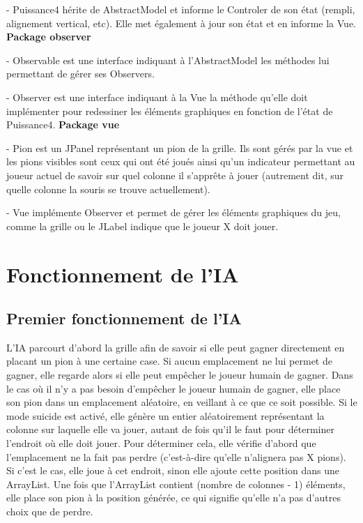 \documentclass{report}
\begin{document}
- Puissance4 hérite de AbstractModel et informe le Controler de son état (rempli, alignement vertical, etc). Elle met également à jour son état et en informe la Vue.
\bigbreak
\textbf{Package observer}

- Observable est une interface indiquant à l'AbstractModel les méthodes lui permettant de gérer ses Observers.

- Observer est une interface indiquant à la Vue la méthode qu'elle doit implémenter pour redessiner les éléments graphiques en fonction de l'état de Puissance4.
\bigbreak
\textbf{Package vue}

- Pion est un JPanel représentant un pion de la grille. Ils sont gérés par la vue et les pions visibles sont ceux qui ont été joués ainsi qu'un indicateur permettant au joueur actuel de savoir sur quel colonne il s'apprête à jouer (autrement dit, sur quelle colonne la souris se trouve actuellement).

- Vue implémente Observer et permet de gérer les éléments graphiques du jeu, comme la grille ou le JLabel indique que le joueur X doit jouer.

\chapter{Fonctionnement de l'IA}
\section{Premier fonctionnement de l'IA}
L'IA parcourt d'abord la grille afin de savoir si elle peut gagner directement en placant un pion à une certaine case. Si aucun emplacement ne lui permet de gagner, elle regarde alors si elle peut empêcher le joueur humain de gagner. Dans le cas où il n'y a pas besoin d'empêcher le joueur humain de gagner, elle place son pion dans un emplacement aléatoire, en veillant à ce que ce soit possible.
Si le mode suicide est activé, elle génère un entier aléatoirement représentant la colonne sur laquelle elle va jouer, autant de fois qu'il le faut pour déterminer l'endroit où elle doit jouer. Pour déterminer cela, elle vérifie d'abord que l'emplacement ne la fait pas perdre (c'est-à-dire qu'elle n'alignera pas X pions). Si c'est le cas, elle joue à cet endroit, sinon elle ajoute cette position dans une ArrayList. Une fois que l'ArrayList contient (nombre de colonnes - 1) éléments, elle place son pion à la position générée, ce qui signifie qu'elle n'a pas d'autres choix que de perdre. 
\end{document}
